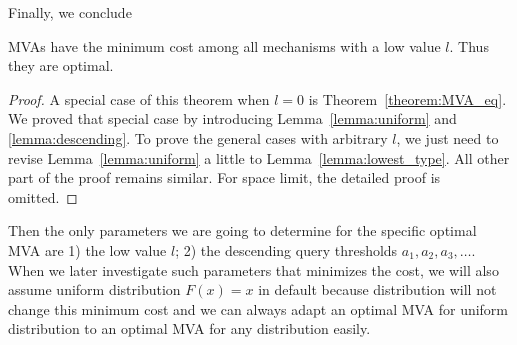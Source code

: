 Finally, we conclude

\begin{theorem}

MVAs have the minimum cost among all mechanisms with a low value $l$. Thus
they are optimal.

\end{theorem}

\begin{proof}
A special case of this theorem when $l = 0$ is Theorem~\ref{theorem:MVA_eq}.
We proved that special case by introducing Lemma~\ref{lemma:uniform} and
\ref{lemma:descending}. To prove the general cases with arbitrary $l$, we just
need to revise Lemma~\ref{lemma:uniform} a little to
Lemma~\ref{lemma:lowest_type}. All other part of the proof remains similar. For
space limit, the detailed proof is omitted.
\end{proof}

Then the only parameters we are going to determine for the
specific optimal MVA are 1) the low value $l$; 2) the descending query
thresholds $a_1, a_2, a_3, \ldots$.
When we later investigate such parameters that minimizes the cost, we will
also assume uniform distribution $F(x) = x$ in default because distribution will not
change this minimum cost and we can always adapt an optimal MVA for uniform distribution
to an optimal MVA for any distribution easily.

